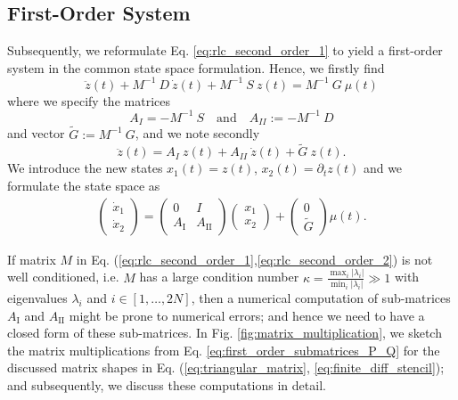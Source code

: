 \documentclass[a4paper, 10pt, twoside, twocolumn]{scrartcl}
\begin{document}
\subsection{First-Order System}
Subsequently, we reformulate Eq. \eqref{eq:rlc_second_order_1} to yield a first-order system in the common state space formulation. Hence, we firstly find
\begin{equation}
	\ddot{z}(t) + M^{-1}~D ~ \dot{z}(t) + M^{-1}~S ~ z(t) = M^{-1}~G ~ \mu(t)	 \label{eq:rlc_second_order_2}
\end{equation}
where we specify the matrices 
\begin{equation}
A_{I} = -M^{-1}~S \quad \text{and} \quad A_{II} := -M^{-1}~D	\label{eq:first_order_submatrices_P_Q}
\end{equation}
and vector $\tilde{G}:= M^{-1}~G$, and we note secondly 
\begin{equation*}
	\ddot{z}(t) = A_{I} ~ z(t)  + A_{II} ~ \dot{z}(t) + \tilde{G} ~ z(t) \text{.}
\end{equation*}
We introduce the new states $x_{1}(t) = z(t)$, $x_{2}(t) = \partial_{t} z(t)$ and we formulate the state space as 
\begin{align}
	\begin{pmatrix}
	\dot{x}_{1} \\	
	\dot{x}_{2}
	\end{pmatrix}
	=
	\begin{pmatrix}
		0 & I \\
		A_{\mathrm{I}} & A_{\mathrm{II}}
	\end{pmatrix}
	\begin{pmatrix}
		{x}_{1} \\	
		{x}_{2}
	\end{pmatrix}
	+
	\begin{pmatrix}
		0  \\
		\tilde{G}
	\end{pmatrix}
	\mu(t)\text{.}
\end{align}


If matrix $M$ in Eq. (\ref{eq:rlc_second_order_1},\ref{eq:rlc_second_order_2}) is not well conditioned, i.e. $M$ has a large condition number $\kappa = \frac{\max_{i} |\lambda_{i}|}{\min_{i} |\lambda_{i}|} \gg 1$ with eigenvalues $\lambda_{i}$ and $i \in [1,\ldots,2N]$, then a numerical computation of sub-matrices $A_{\mathrm{I}}$ and $A_{\mathrm{II}}$ might be prone to numerical errors; and hence we need to have a closed form of these sub-matrices. In Fig. \ref{fig:matrix_multiplication}, we sketch the matrix multiplications from Eq. \eqref{eq:first_order_submatrices_P_Q} for the discussed matrix shapes in Eq. (\ref{eq:triangular_matrix}, \ref{eq:finite_diff_stencil}); and subsequently, we discuss these computations in detail. 
\end{document}
